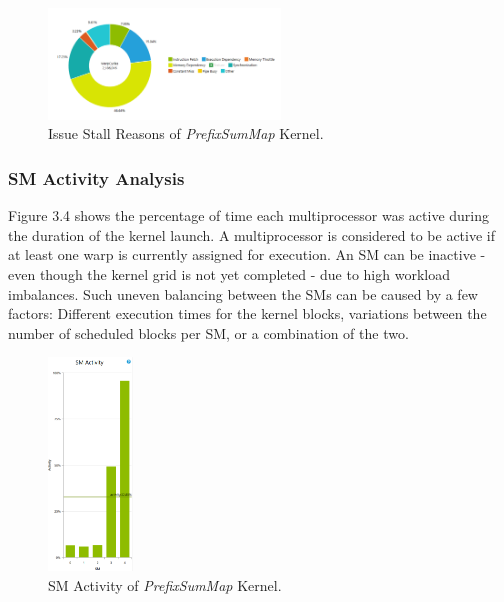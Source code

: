 \documentclass[12pt]{article}
\numberwithin{equation}{section}
\numberwithin{table}{section}
\numberwithin{figure}{section}
\begin{document}
\begin{figure}[!h]\centering
	\includegraphics[width=0.55\textwidth]{3_3.png}
	\caption{Issue Stall Reasons of \textit{PrefixSumMap} Kernel.}
	\label{pl1}
\end{figure}

\subsubsection{SM Activity Analysis}
Figure 3.4 shows the percentage of time each multiprocessor was active during the duration of the kernel launch. A multiprocessor is considered to be active if at least one warp is currently assigned for execution. An SM can be inactive - even though the kernel grid is not yet completed - due to high workload imbalances. Such uneven balancing between the SMs can be caused by a few factors: Different execution times for the kernel blocks, variations between the number of scheduled blocks per SM, or a combination of the two.
\begin{figure}[!h]\centering
	\includegraphics[width=0.2\textwidth]{3_4.png}
	\caption{SM Activity of \textit{PrefixSumMap} Kernel.}
	\label{pl1}
\end{figure}
\end{document}
